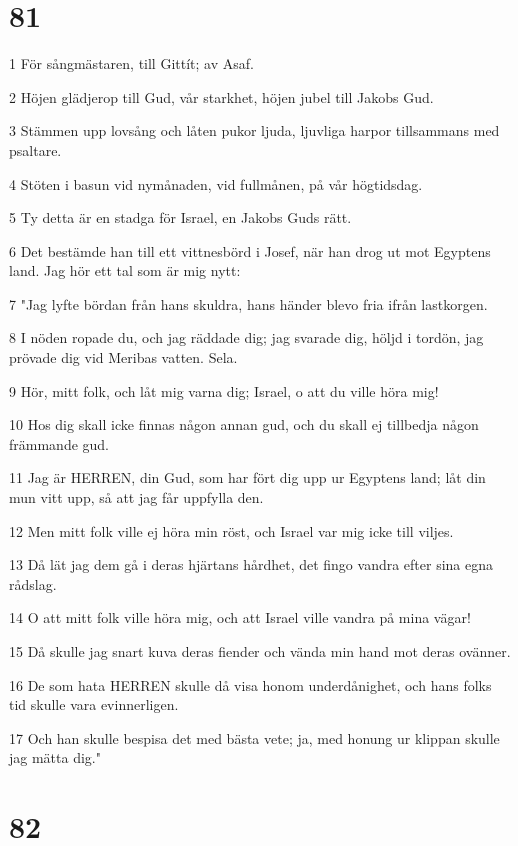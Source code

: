 \chapter{81}

\par 1 För sångmästaren, till Gittít; av Asaf.
\par 2 Höjen glädjerop till Gud, vår starkhet, höjen jubel till Jakobs Gud.
\par 3 Stämmen upp lovsång och låten pukor ljuda, ljuvliga harpor tillsammans med psaltare.
\par 4 Stöten i basun vid nymånaden, vid fullmånen, på vår högtidsdag.
\par 5 Ty detta är en stadga för Israel, en Jakobs Guds rätt.
\par 6 Det bestämde han till ett vittnesbörd i Josef, när han drog ut mot Egyptens land. Jag hör ett tal som är mig nytt:
\par 7 "Jag lyfte bördan från hans skuldra, hans händer blevo fria ifrån lastkorgen.
\par 8 I nöden ropade du, och jag räddade dig; jag svarade dig, höljd i tordön, jag prövade dig vid Meribas vatten. Sela.
\par 9 Hör, mitt folk, och låt mig varna dig; Israel, o att du ville höra mig!
\par 10 Hos dig skall icke finnas någon annan gud, och du skall ej tillbedja någon främmande gud.
\par 11 Jag är HERREN, din Gud, som har fört dig upp ur Egyptens land; låt din mun vitt upp, så att jag får uppfylla den.
\par 12 Men mitt folk ville ej höra min röst, och Israel var mig icke till viljes.
\par 13 Då lät jag dem gå i deras hjärtans hårdhet, det fingo vandra efter sina egna rådslag.
\par 14 O att mitt folk ville höra mig, och att Israel ville vandra på mina vägar!
\par 15 Då skulle jag snart kuva deras fiender och vända min hand mot deras ovänner.
\par 16 De som hata HERREN skulle då visa honom underdånighet, och hans folks tid skulle vara evinnerligen.
\par 17 Och han skulle bespisa det med bästa vete; ja, med honung ur klippan skulle jag mätta dig."

\chapter{82}

